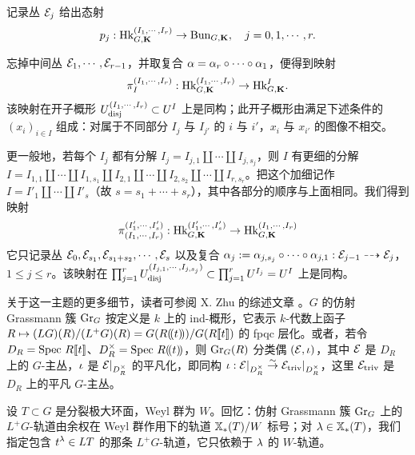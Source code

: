 记录丛 $\mathcal{E}_{j}$ 给出态射
\begin{equation*}
p_{j}: \textup{Hk}^{(I_{1},\cdots, I_{r})}_{G,\mathbf{K}}\to \textup{Bun}_{G,\mathbf{K}}, \quad j=0,1,\cdots, r.
\end{equation*}

忘掉中间丛 $\mathcal{E}_{1},\cdots, \mathcal{E}_{r-1}$，并取复合 $\alpha=\alpha_{r}\circ\cdots \circ\alpha_{1}$，便得到映射
\begin{equation*}
\pi^{(I_{1},\cdots, I_{r})}_{I}: \textup{Hk}^{(I_{1},\cdots, I_{r})}_{G,\mathbf{K}}\to \textup{Hk}^{I}_{G,\mathbf{K}}.
\end{equation*}
该映射在开子概形 $U^{(I_{1},\cdots, I_{r})}_{\mathrm{disj}}\subset U^{I}$ 上是同构；此开子概形由满足下述条件的 $(x_{i})_{i\in I}$ 组成：对属于不同部分 $I_{j}$ 与 $I_{j'}$ 的 $i$ 与 $i'$，$x_{i}$ 与 $x_{i'}$ 的图像不相交。

更一般地，若每个 $I_{j}$ 都有分解 $I_{j}=I_{j,1}\coprod \cdots\coprod I_{j,s_{j}}$，则 $I$ 有更细的分解 $I=I_{1,1}\coprod \cdots\coprod I_{1,s_{1}}\coprod I_{2,1}\coprod\cdots\coprod I_{2,s_{2}}\coprod \cdots\coprod I_{r,s_{r}}$。把这个加细记作 $I=I'_{1}\coprod \cdots\coprod I'_{s}$（故 $s=s_{1}+\cdots+s_{r}$），其中各部分的顺序与上面相同。我们得到映射
\begin{equation*}
\pi^{(I'_{1},\cdots, I'_{s})}_{(I_{1},\cdots, I_{r})}: \textup{Hk}^{(I'_{1},\cdots, I'_{s})}_{G,\mathbf{K}}\to \textup{Hk}^{(I_{1},\cdots, I_{r})}_{G,\mathbf{K}}
\end{equation*}
它只记录丛 $\mathcal{E}_{0},\mathcal{E}_{s_{1}},\mathcal{E}_{s_{1}+s_{2}},\cdots, \mathcal{E}_{s}$ 以及复合 $\alpha_{j}:=\alpha_{j,s_{j}}\circ\cdots\circ\alpha_{j,1}: \mathcal{E}_{j-1}\dashrightarrow\mathcal{E}_{j}$，$1\le j\le r$。该映射在 $\prod_{j=1}^{r}U^{(I_{j,1},\cdots, I_{j,s_{j}})}_{\mathrm{disj}}\subset \prod_{j=1}^{r}U^{I_{j}}=U^{I}$ 上是同构。



\label{sss:Gr}
关于这一主题的更多细节，读者可参阅 X. Zhu 的综述文章 \cite{Zhu-Satake}。$G$ 的仿射 Grassmann 簇 $\textup{Gr}_{G}$ 按定义是 $k$ 上的 ind-概形，它表示 $k$-代数上函子 $R\mapsto (LG)(R)/(L^{+}G)(R)=G(R(\!(t)\!))/G(R[\![t]\!])$ 的 fpqc 层化。或者，若令 $D_{R}=\textup{Spec}\  R[\![t]\!]$、$D^{\times}_{R}=\textup{Spec}\  R(\!(t)\!)$，则 $\textup{Gr}_{G}(R)$ 分类偶 $(\mathcal{E}, \iota)$，其中 $\mathcal{E}$ 是 $D_{R}$ 上的 $G$-主丛，$\iota$ 是 $\mathcal{E}|_{D^{\times}_{R}}$ 的平凡化，即同构 $\iota: \mathcal{E}|_{D^{\times}_{R}}\stackrel{\sim}{\to} \mathcal{E}_{\textup{triv}}|_{D^{\times}_{R}}$，这里 $\mathcal{E}_{\textup{triv}}$ 是 $D_{R}$ 上的平凡 $G$-主丛。


设 $T\subset G$ 是分裂极大环面，Weyl 群为 $W$。回忆：仿射 Grassmann 簇 $\textup{Gr}_{G}$ 上的 $L^{+}G$-轨道由余权在 Weyl 群作用下的轨道 $\mathbb{X}_*(T)/W$ 标号；对 $\lambda\in \mathbb{X}_*(T)$，我们指定包含 $t^{\lambda}\in LT$ 的那条 $L^{+}G$-轨道，它只依赖于 $\lambda$ 的 $W$-轨道。

